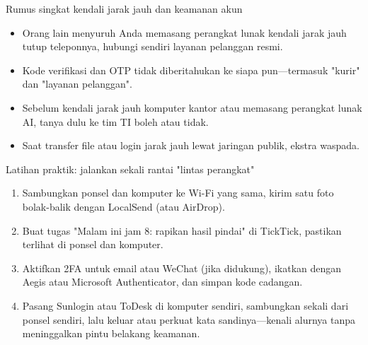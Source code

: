 \begin{tcbwarn}{Rumus singkat kendali jarak jauh dan keamanan akun}
\begin{itemize}
  \item Orang lain menyuruh Anda memasang perangkat lunak kendali jarak jauh tutup teleponnya, hubungi sendiri layanan pelanggan resmi.
  \item Kode verifikasi dan OTP tidak diberitahukan ke siapa pun—termasuk "kurir" dan "layanan pelanggan".
  \item Sebelum kendali jarak jauh komputer kantor atau memasang perangkat lunak AI, tanya dulu ke tim TI boleh atau tidak.
  \item Saat transfer file atau login jarak jauh lewat jaringan publik, ekstra waspada.
\end{itemize}

\end{tcbwarn}

\begin{tcbpractice}{Latihan praktik: jalankan sekali rantai "lintas perangkat"}
\begin{enumerate}
  \item Sambungkan ponsel dan komputer ke Wi-Fi yang sama, kirim satu foto bolak-balik dengan LocalSend (atau AirDrop).
  \item Buat tugas "Malam ini jam 8: rapikan hasil pindai" di TickTick, pastikan terlihat di ponsel dan komputer.
  \item Aktifkan 2FA untuk email atau WeChat (jika didukung), ikatkan dengan Aegis atau Microsoft Authenticator, dan simpan kode cadangan.
  \item Pasang Sunlogin atau ToDesk di komputer sendiri, sambungkan sekali dari ponsel sendiri, lalu keluar atau perkuat kata sandinya—kenali alurnya tanpa meninggalkan pintu belakang keamanan.
\end{enumerate}

\end{tcbpractice}
